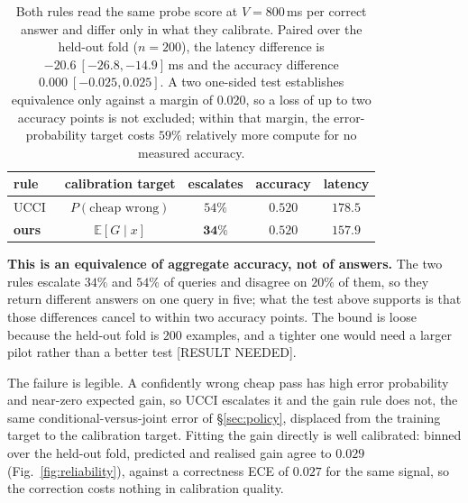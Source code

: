 \documentclass[10pt,twocolumn]{article}
\theoremstyle{plain}
\begin{document}
\begin{table}[t]
\centering\small
\setlength{\tabcolsep}{4pt}
\begin{tabular}{lcccc}
\toprule
rule & calibration target & escalates & accuracy & latency \\
\midrule
UCCI~\cite{ucci} & $P(\text{cheap wrong})$ & $54\%$ & $0.520$ & $178.5$ \\
\textbf{ours} & $\mathbb{E}[G \mid x]$ & $\mathbf{34\%}$ & $0.520$ & $\mathbf{157.9}$ \\
\bottomrule
\end{tabular}
\caption{Both rules read the same probe score at $V = 800$\,ms per correct
answer and differ only in what they calibrate. Paired over the held-out fold
($n = 200$), the latency difference is $-20.6\ [-26.8, -14.9]$\,ms and the
accuracy difference $0.000\ [-0.025, 0.025]$. A two one-sided test establishes
equivalence only against a margin of $0.020$, so a loss of up to two accuracy
points is not excluded; within that margin, the error-probability target costs
$59\%$ relatively more compute for no measured accuracy.}
\label{tab:rule}
\end{table}

\textbf{This is an equivalence of aggregate accuracy, not of answers.} The two
rules escalate $34\%$ and $54\%$ of queries and disagree on $20\%$ of them, so
they return different answers on one query in five; what the test above
supports is that those differences cancel to within two accuracy points. The
bound is loose because the held-out fold is $200$ examples, and a tighter one
would need a larger pilot rather than a better test [RESULT NEEDED].

The failure is legible. A confidently wrong cheap pass has high error
probability and near-zero expected gain, so UCCI escalates it and the gain rule
does not, the same conditional-versus-joint error of \S\ref{sec:policy},
displaced from the training target to the calibration target. Fitting the gain
directly is well calibrated: binned over the held-out fold, predicted and
realised gain agree to $0.029$ (Fig.~\ref{fig:reliability}), against a
correctness ECE of $0.027$ for the same signal, so the correction costs nothing
in calibration quality.
\end{document}
